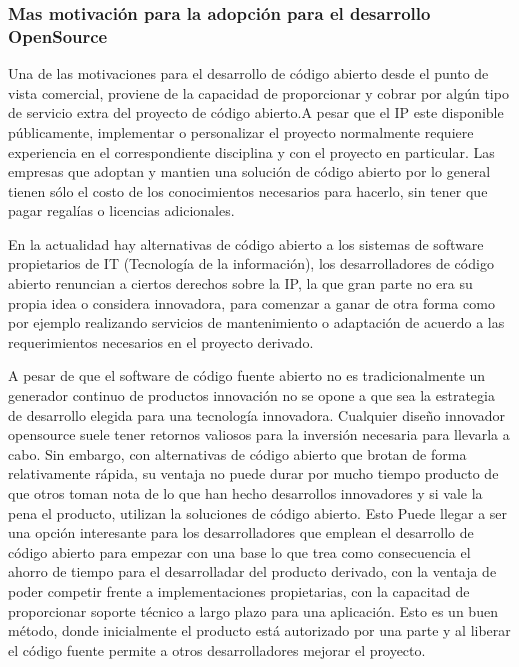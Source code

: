		\subsubsection{Mas motivación para la adopción para el desarrollo OpenSource}

Una de las motivaciones para el desarrollo de código abierto desde el punto de vista comercial,  proviene de la capacidad de proporcionar y cobrar por algún tipo de servicio extra del proyecto de código abierto.A pesar que el IP este disponible públicamente, implementar o personalizar el proyecto normalmente requiere experiencia en el correspondiente disciplina y con el proyecto en particular. Las empresas que adoptan y mantien una solución de código abierto por lo general tienen sólo el costo de los conocimientos necesarios para hacerlo, sin tener que pagar regalías o licencias adicionales.  

En la actualidad hay alternativas de código abierto a los sistemas de software propietarios de IT (Tecnología de la información),  los desarrolladores de código abierto renuncian a ciertos derechos sobre la IP, la que gran parte no era su propia idea o considera innovadora, para comenzar a ganar de otra forma como por ejemplo realizando servicios de mantenimiento o adaptación de acuerdo a las requerimientos necesarios en el proyecto derivado.

A pesar de que el software de código fuente abierto no es tradicionalmente un generador continuo de productos innovación no se opone a que sea la estrategia de desarrollo elegida para una tecnología innovadora. Cualquier diseño innovador opensource suele tener retornos valiosos para la inversión necesaria para llevarla a cabo. Sin embargo, con alternativas de código abierto que brotan de forma relativamente rápida, su ventaja no puede durar por mucho tiempo producto de que otros toman nota de lo que han hecho desarrollos innovadores y si vale la pena el producto, utilizan la soluciones de código abierto. Esto  Puede llegar a ser una opción interesante para los desarrolladores que emplean el desarrollo de código abierto para empezar con una base lo que trea como consecuencia el ahorro de tiempo para el desarrolladar del producto derivado, con la ventaja  de poder competir frente a  implementaciones propietarias, con la capacitad de proporcionar soporte técnico a largo plazo para una aplicación. Esto es un buen método, donde inicialmente el producto está autorizado por una parte y al liberar  el código fuente permite a otros desarrolladores mejorar el proyecto.

